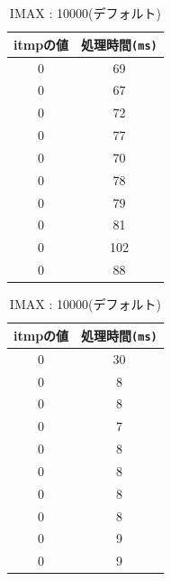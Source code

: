 \documentclass[10pt]{jarticle}
\begin{document}
\newpage
\begin{table}
	\caption{IMAX : 10000(デフォルト)}
	\label{table:10000}
	\begin{minipage}{.45\textwidth}
		\centering
		\label{table:defosemaari}
		\begin{tabular}{|c|c|}
			\hline
			itmpの値 & 処理時間\verb|(ms)|\\
			\hline
			0 & 69\\
			0 & 67\\
			0 & 72\\
			0 & 77\\
			0 & 70\\
			0 & 78\\
			0 & 79\\
			0 & 81\\
			0 & 102\\
			0 & 88\\
			\hline
		\end{tabular}
	\end{minipage}
	\begin{minipage}{.45\textwidth}
		\centering
		\label{table:defosemanasi}
		\begin{tabular}{|c|c|}
			\hline
			itmpの値 & 処理時間\verb|(ms)|\\
			\hline
			0 & 30 \\
			0 & 8 \\
			0 & 8 \\
			0 & 7 \\
			0 & 8 \\
			0 & 8 \\
			0 & 8 \\
			0 & 8 \\
			0 & 9 \\
			0 & 9 \\
			\hline
		\end{tabular}
	\end{minipage}
\end{table}
\end{document}
